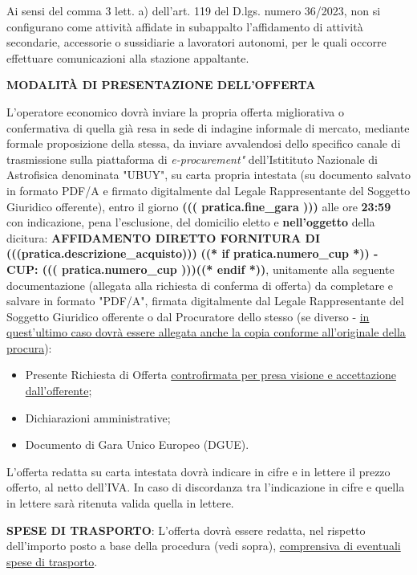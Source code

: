 Ai sensi del comma 3 lett. a) dell'art. 119 del D.lgs. numero 36/2023,
non si configurano come attività affidate in subappalto l'affidamento
di attività secondarie, accessorie o sussidiarie a lavoratori autonomi,
per le quali occorre effettuare comunicazioni alla stazione appaltante.

\textbf{MODALITÀ DI PRESENTAZIONE DELL'OFFERTA}

L'operatore economico dovrà inviare la propria offerta migliorativa
o confermativa di quella già resa in sede di indagine informale
di mercato, mediante formale proposizione della stessa, da inviare
avvalendosi dello specifico canale di trasmissione sulla piattaforma
di \textit{e-procurement"} dell'Istitituto Nazionale di Astrofisica
denominata "UBUY", su carta propria intestata (su documento salvato
in formato PDF/A e firmato digitalmente dal Legale Rappresentante del
Soggetto Giuridico offerente), entro il giorno \textbf{((( pratica.fine_gara )))} alle ore
\textbf{23:59} con indicazione, pena l'esclusione, del domicilio
eletto e \textbf{nell'oggetto} della dicitura: \textbf{AFFIDAMENTO
DIRETTO FORNITURA DI (((pratica.descrizione_acquisto)))}
\textbf{((* if pratica.numero_cup *)) - CUP: ((( pratica.numero_cup )))((* endif *))},
unitamente alla
seguente documentazione (allegata alla richiesta di conferma di offerta)
da completare e salvare in formato "PDF/A", firmata digitalmente dal
Legale Rappresentante del Soggetto Giuridico offerente o dal Procuratore
dello stesso (se diverso - \ul{in quest'ultimo caso dovr\`a essere
allegata anche la copia conforme all'originale della procura}):

\begin{itemize}
\item Presente Richiesta di Offerta \ul{controfirmata per presa visione e accettazione dall'offerente};
\item Dichiarazioni amministrative;
\item Documento di Gara Unico Europeo (DGUE).
\end{itemize}


L'offerta redatta su carta intestata dovrà indicare in cifre e in lettere il prezzo offerto, al
netto dell'IVA. In caso di discordanza tra l'indicazione in cifre
e quella in lettere sarà ritenuta valida quella in lettere.

\textbf{SPESE DI TRASPORTO}: L'offerta dovrà essere redatta, nel
rispetto dell'importo posto a base della procedura (vedi sopra),
\ul{comprensiva di eventuali spese di trasporto}.


